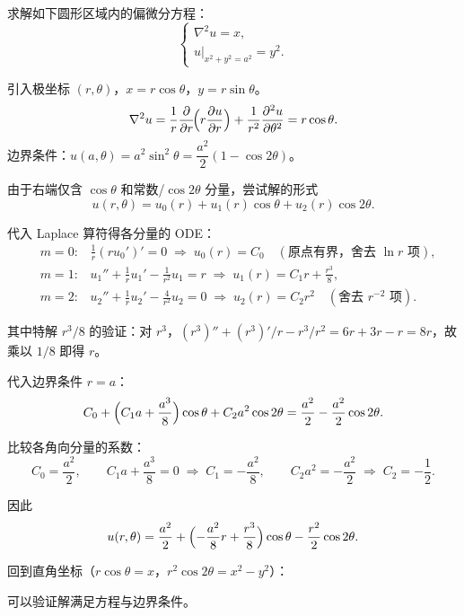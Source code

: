 \begin{question}[圆域 Poisson 方程]

求解如下圆形区域内的偏微分方程：
\[
\begin{cases}
\nabla^{2} u = x,\\[4pt]
u|_{x^{2}+y^{2}=a^{2}} = y^{2}.
\end{cases}
\]

\begin{solution}

引入极坐标 $(r,\theta)$，$x=r\cos\theta$，$y=r\sin\theta$。
\[
\nabla^{2} u = \frac{1}{r}\frac{\partial}{\partial r}\!\Bigl(r\frac{\partial u}{\partial r}\Bigr)
+ \frac{1}{r^{2}}\frac{\partial^{2} u}{\partial\theta^{2}} = r\cos\theta.
\]
边界条件：$u(a,\theta) = a^{2}\sin^{2}\theta = \dfrac{a^{2}}{2}(1-\cos 2\theta)$。

由于右端仅含 $\cos\theta$ 和常数/$\cos2\theta$ 分量，尝试解的形式
\[
u(r,\theta) = u_{0}(r) + u_{1}(r)\cos\theta + u_{2}(r)\cos 2\theta.
\]

代入 Laplace 算符得各分量的 ODE：
\begin{align*}
&\text{$m=0$:}\quad \frac{1}{r}(r u_{0}')' = 0
\;\Longrightarrow\; u_{0}(r) = C_{0}\quad(\text{原点有界，舍去 }\ln r\text{ 项}),\\[4pt]
&\text{$m=1$:}\quad u_{1}'' + \frac{1}{r}u_{1}' - \frac{1}{r^{2}}u_{1} = r
\;\Longrightarrow\; u_{1}(r) = C_{1}r + \frac{r^{3}}{8},\\[4pt]
&\text{$m=2$:}\quad u_{2}'' + \frac{1}{r}u_{2}' - \frac{4}{r^{2}}u_{2} = 0
\;\Longrightarrow\; u_{2}(r) = C_{2}r^{2}\quad(\text{舍去 }r^{-2}\text{ 项}).
\end{align*}

其中特解 $r^{3}/8$ 的验证：对 $r^{3}$，$(r^{3})''+(r^{3})'/r-r^{3}/r^{2}=6r+3r-r=8r$，故乘以 $1/8$ 即得 $r$。

代入边界条件 $r=a$：
\[
C_{0} + \Bigl(C_{1}a + \frac{a^{3}}{8}\Bigr)\cos\theta + C_{2}a^{2}\cos 2\theta
= \frac{a^{2}}{2} - \frac{a^{2}}{2}\cos 2\theta.
\]

比较各角向分量的系数：
\[
C_{0} = \frac{a^{2}}{2},\qquad
C_{1}a + \frac{a^{3}}{8} = 0\;\Longrightarrow\; C_{1} = -\frac{a^{2}}{8},\qquad
C_{2}a^{2} = -\frac{a^{2}}{2}\;\Longrightarrow\; C_{2} = -\frac{1}{2}.
\]

因此
\[
u(r,\theta) = \frac{a^{2}}{2}
+ \Bigl(-\frac{a^{2}}{8}r + \frac{r^{3}}{8}\Bigr)\cos\theta
- \frac{r^{2}}{2}\cos 2\theta.
\]

回到直角坐标（$r\cos\theta=x$，$r^{2}\cos2\theta=x^{2}-y^{2}$）：


可以验证解满足方程与边界条件。
\end{solution}
\end{question}

